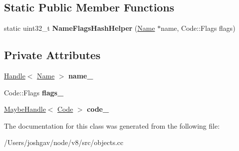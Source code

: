 \subsection*{Static Public Member Functions}
\begin{DoxyCompactItemize}
\item 
static uint32\+\_\+t {\bfseries Name\+Flags\+Hash\+Helper} (\hyperlink{classv8_1_1internal_1_1_name}{Name} $\ast$name, Code\+::\+Flags flags)\hypertarget{classv8_1_1internal_1_1_code_cache_hash_table_key_a02223a374cae60f793d50dfaa6f99a9c}{}\label{classv8_1_1internal_1_1_code_cache_hash_table_key_a02223a374cae60f793d50dfaa6f99a9c}

\end{DoxyCompactItemize}
\subsection*{Private Attributes}
\begin{DoxyCompactItemize}
\item 
\hyperlink{classv8_1_1internal_1_1_handle}{Handle}$<$ \hyperlink{classv8_1_1internal_1_1_name}{Name} $>$ {\bfseries name\+\_\+}\hypertarget{classv8_1_1internal_1_1_code_cache_hash_table_key_a2f972645be30a27978aeb82d527d3f14}{}\label{classv8_1_1internal_1_1_code_cache_hash_table_key_a2f972645be30a27978aeb82d527d3f14}

\item 
Code\+::\+Flags {\bfseries flags\+\_\+}\hypertarget{classv8_1_1internal_1_1_code_cache_hash_table_key_aa5f8a3324172864f2741c3fe33a5400e}{}\label{classv8_1_1internal_1_1_code_cache_hash_table_key_aa5f8a3324172864f2741c3fe33a5400e}

\item 
\hyperlink{classv8_1_1internal_1_1_maybe_handle}{Maybe\+Handle}$<$ \hyperlink{classv8_1_1internal_1_1_code}{Code} $>$ {\bfseries code\+\_\+}\hypertarget{classv8_1_1internal_1_1_code_cache_hash_table_key_a2267affd6e57c691804c81a224224c73}{}\label{classv8_1_1internal_1_1_code_cache_hash_table_key_a2267affd6e57c691804c81a224224c73}

\end{DoxyCompactItemize}


The documentation for this class was generated from the following file\+:\begin{DoxyCompactItemize}
\item 
/\+Users/joshgav/node/v8/src/objects.\+cc\end{DoxyCompactItemize}
